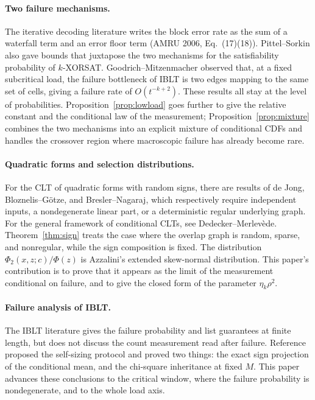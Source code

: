 \paragraph{Two failure mechanisms.} The iterative decoding literature writes the block error rate as the sum of a waterfall
term and an error floor term (AMRU 2006, Eq.~(17)(18)\cite{amru06}). Pittel--Sorkin
also gave bounds that juxtapose the two mechanisms for the satisfiability probability of $k$-XORSAT\cite{ps}. Goodrich--Mitzenmacher
observed that, at a fixed subcritical load, the failure bottleneck of IBLT is two edges mapping to the same set of cells, giving a
failure rate of $O(t^{-k+2})$\cite{gm}. These results all stay at the level of probabilities.
Proposition~\ref{prop:lowload} goes further to give the relative constant and the conditional law of the measurement; Proposition~\ref{prop:mixture}
combines the two mechanisms into an explicit mixture of conditional CDFs and handles the crossover region where macroscopic failure has
already become rare.

\paragraph{Quadratic forms and selection distributions.} For the CLT of quadratic forms with random signs, there are results of de
Jong\cite{dejong}, Bloznelis--Götze\cite{bg}, and
Bresler--Nagaraj\cite{bn}, which respectively require independent inputs, a nondegenerate linear part, or a deterministic regular
underlying graph. For the general framework of conditional CLTs, see Dedecker--Merlevède\cite{dmer}. Theorem~\ref{thm:sign} treats
the case where the overlap graph is random, sparse, and nonregular, while the sign composition is fixed. The distribution
$\Phi_2(x,z;c)/\Phi(z)$ is Azzalini's extended skew-normal distribution\cite{azz85,aa06}. This paper's contribution is to prove that it
appears as the limit of the measurement conditional on failure, and to give the closed form of the parameter $\eta_k\rho^2$.

\paragraph{Failure analysis of IBLT.} The IBLT literature gives the failure probability and list guarantees at finite
length\cite{gm,yw,mizrahi}, but does not discuss the count measurement read after failure. Reference~\cite{prior} proposed the
self-sizing protocol and proved two things: the exact sign projection of the conditional mean, and the chi-square inheritance at fixed
$M$. This paper advances these conclusions to the critical window, where the failure probability is nondegenerate, and to the whole load
axis.
